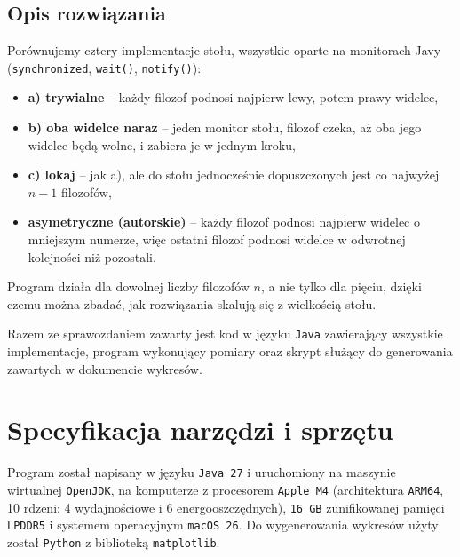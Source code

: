 \documentclass[11pt,a4paper]{article}
\begin{document}
\subsection{Opis rozwiązania}
Porównujemy cztery implementacje stołu, wszystkie oparte na monitorach Javy
(\texttt{synchronized}, \texttt{wait()}, \texttt{notify()}):
\begin{itemize}
    \item \textbf{a) trywialne} -- każdy filozof podnosi najpierw lewy, potem prawy widelec,
    \item \textbf{b) oba widelce naraz} -- jeden monitor stołu, filozof czeka, aż oba jego widelce
          będą wolne, i zabiera je w jednym kroku,
    \item \textbf{c) lokaj} -- jak a), ale do stołu jednocześnie dopuszczonych jest co najwyżej $n - 1$ filozofów,
    \item \textbf{asymetryczne (autorskie)} -- każdy filozof podnosi najpierw widelec o mniejszym numerze,
          więc ostatni filozof podnosi widelce w odwrotnej kolejności niż pozostali.
\end{itemize}
Program działa dla dowolnej liczby filozofów $n$, a nie tylko dla pięciu, dzięki czemu można zbadać,
jak rozwiązania skalują się z wielkością stołu.

Razem ze sprawozdaniem zawarty jest kod w języku \texttt{Java} zawierający wszystkie implementacje,
program wykonujący pomiary oraz skrypt służący do generowania zawartych w dokumencie wykresów.

\section{Specyfikacja narzędzi i sprzętu}
Program został napisany w języku \texttt{Java 27} i uruchomiony na maszynie wirtualnej
\texttt{OpenJDK}, na komputerze z procesorem \texttt{Apple M4} (architektura \texttt{ARM64},
10 rdzeni: 4 wydajnościowe i 6 energooszczędnych), \texttt{16 GB} zunifikowanej pamięci
\texttt{LPDDR5} i systemem operacyjnym \texttt{macOS 26}.
Do wygenerowania wykresów użyty został \texttt{Python} z biblioteką \texttt{matplotlib}.
\end{document}
